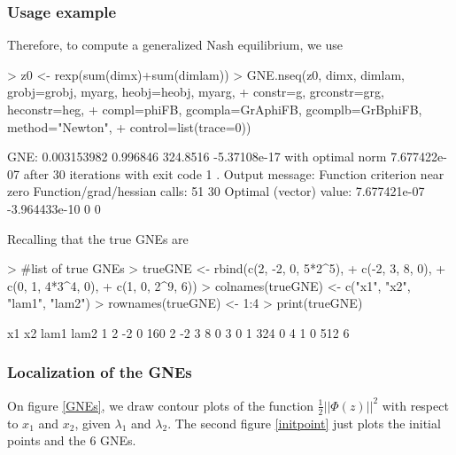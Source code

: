 \documentclass[11pt, a4paper]{article}
\begin{document}
\subsubsection{Usage example}

Therefore, to compute a generalized Nash equilibrium, we use
\begin{Schunk}
\begin{Sinput}
> z0 <- rexp(sum(dimx)+sum(dimlam))
> GNE.nseq(z0, dimx, dimlam, grobj=grobj, myarg, heobj=heobj, myarg, 
+ 	constr=g, grconstr=grg, heconstr=heg, 
+ 	compl=phiFB, gcompla=GrAphiFB, gcomplb=GrBphiFB, method="Newton", 
+ 	control=list(trace=0))
\end{Sinput}
\begin{Soutput}
GNE: 0.003153982 0.996846 324.8516 -5.37108e-17 
with optimal norm 7.677422e-07 
after  30 iterations with exit code 1 .
Output message: Function criterion near zero 
Function/grad/hessian calls: 51 30 
Optimal (vector) value: 7.677421e-07 -3.964433e-10 0 0 
\end{Soutput}
\end{Schunk}
Recalling that the true GNEs are
\begin{Schunk}
\begin{Sinput}
> #list of true GNEs
> trueGNE <- rbind(c(2, -2, 0, 5*2^5),
+ 	c(-2, 3, 8, 0),
+ 	c(0, 1, 4*3^4, 0),
+ 	c(1, 0, 2^9, 6))
> colnames(trueGNE) <- c("x1", "x2", "lam1", "lam2")
> rownames(trueGNE) <- 1:4
> print(trueGNE)
\end{Sinput}
\begin{Soutput}
  x1 x2 lam1 lam2
1  2 -2    0  160
2 -2  3    8    0
3  0  1  324    0
4  1  0  512    6
\end{Soutput}
\end{Schunk}

\subsubsection{Localization of the GNEs}

On figure \ref{GNEs}, we draw contour plots of the function $\frac{1}{2} || \Phi(z) ||^2$ with respect to $x_1$ and $x_2$, given $\lambda_1$ and $\lambda_2$. The second figure \ref{initpoint} just plots the initial points and the 6 GNEs.
\end{document}
